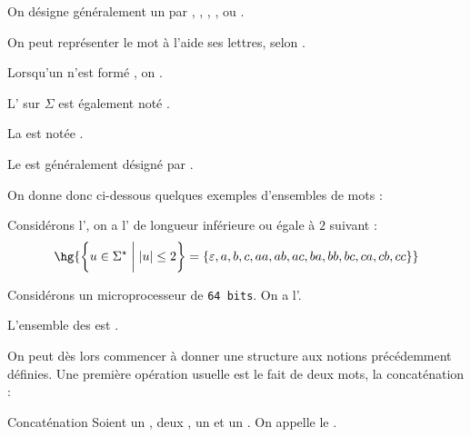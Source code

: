 \documentclass[a4paper,french,bookmarks]{book}
\begin{document}
    \begin{notation}
        \begin{enumerate}
            \itt On désigne généralement un  par , , , ,  ou .
            
            \itt On peut représenter le mot  à l'aide ses lettres, selon . 
            
            \itt Lorsqu'un  n'est formé , on .
            
            \itt L' sur $\Sigma$ est également noté \hg{$\Sigma^\star$}.
            
            \itt La  est notée .
            
            \itt Le  est généralement désigné par \hg{$\epsilon$}.
        \end{enumerate}
    \end{notation}
    
    On donne donc ci-dessous quelques exemples d'ensembles de mots :
    \begin{example}{}{}
        \begin{enumerate}
            \itt Considérons l', on a l' de longueur inférieure ou égale à $2$ suivant :
            \[ \hg{\ens{u \in \Sigma^\star \vphantom{\dfrac{-}{-}}\enstq \mod{u} \leq 2} = \ens{\epsilon, a, b, c, aa, ab, ac, ba, bb, bc, ca, cb, cc}} \]
            
            \itt Considérons un microprocesseur de \texttt{64 bits}. On a l'.
            
            L'ensemble des  est . 
        \end{enumerate}
    \end{example}
    
    On peut dès lors commencer à donner une structure aux notions précédemment définies. Une première opération usuelle est le fait de  deux mots, \ie la concaténation :
    
    \begin{definition}{Concaténation}{}
        Soient \hg{$\Sigma$} un ,  deux ,  un  et  un . On appelle  le . 
    \end{definition}{}{}
    
\end{document}
